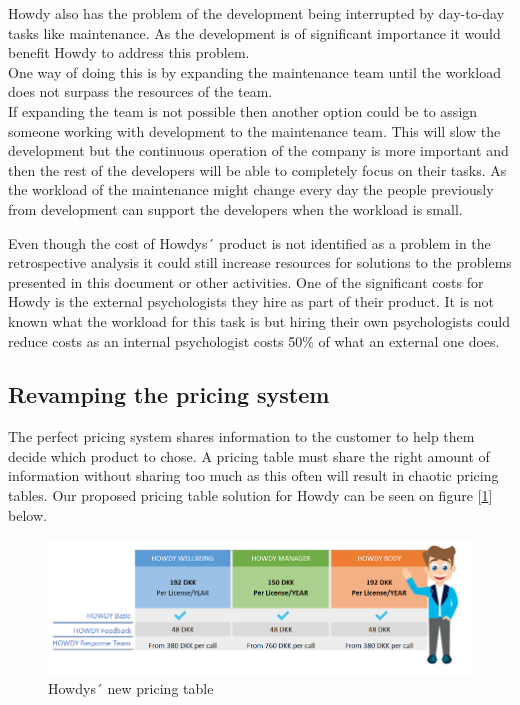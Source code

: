 \noindent Howdy also has the problem of the development being interrupted by day-to-day tasks like maintenance. As the development is of significant importance it would benefit Howdy to address this problem.\\
\noindent One way of doing this is by expanding the maintenance team until the workload does not surpass the resources of the team.\\
\noindent If expanding the team is not possible then another option could be to assign someone working with development to the maintenance team. This will slow the development but the continuous operation of the company is more important and then the rest of the developers will be able to completely focus on their tasks. As the workload of the maintenance might change every day the people previously from development can support the developers when the workload is small.

\noindent Even though the cost of Howdys´ product is not identified as a problem in the retrospective analysis it could still increase resources for solutions to the problems presented in this document or other activities. One of the significant costs for Howdy is the external psychologists they hire as part of their product. It is not known what the workload for this task is but hiring their own psychologists could reduce costs as an internal psychologist costs 50\% of what an external one does.

\subsection{Revamping the pricing system}
The perfect pricing system shares information to the customer to help them decide which product to chose. A pricing table must share the right amount of information without sharing too much as this often will result in chaotic pricing tables. Our proposed pricing table solution for Howdy can be seen on figure [\ref{pricingtable}] below.

\begin{figure}[H]
\centering
\includegraphics[scale=0.72]{figures/pricing_Howdy.png}
\caption{Howdys´ new pricing table}
\label{pricingtable}
\end{figure}

